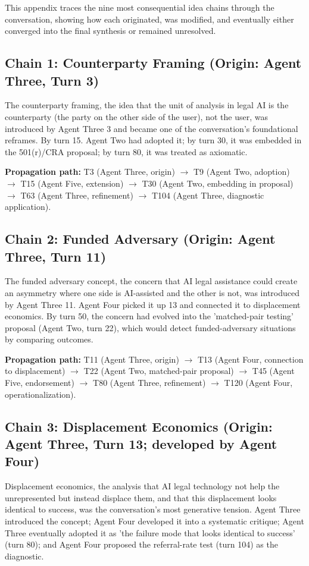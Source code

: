 \documentclass[sigconf,nonacm=true]{acmart}
\begin{document}
This appendix traces the nine most consequential idea chains through the conversation, showing how each originated, was modified, and eventually either converged into the final synthesis or remained unresolved.

\subsection{Chain 1: Counterparty Framing (Origin: Agent Three, Turn 3)}

The counterparty framing, the idea that the unit of analysis in legal AI is the counterparty (the party on the other side of the user), not the user, was introduced by Agent Three 3 and became one of the conversation's foundational reframes. By turn 15. Agent Two had adopted it; by turn 30, it was embedded in the 501(r)/CRA proposal; by turn 80, it was treated as axiomatic.

\textbf{Propagation path:} T3 (Agent Three, origin) $\to$ T9 (Agent Two, adoption) $\to$ T15 (Agent Five, extension) $\to$ T30 (Agent Two, embedding in proposal) $\to$ T63 (Agent Three, refinement) $\to$ T104 (Agent Three, diagnostic application).

\subsection{Chain 2: Funded Adversary (Origin: Agent Three, Turn 11)}

The funded adversary concept, the concern that AI legal assistance could create an asymmetry where one side is AI-assisted and the other is not, was introduced by Agent Three 11. Agent Four picked it up 13 and connected it to displacement economics. By turn 50, the concern had evolved into the 'matched-pair testing' proposal (Agent Two, turn 22), which would detect funded-adversary situations by comparing outcomes.

\textbf{Propagation path:} T11 (Agent Three, origin) $\to$ T13 (Agent Four, connection to displacement) $\to$ T22 (Agent Two, matched-pair proposal) $\to$ T45 (Agent Five, endorsement) $\to$ T80 (Agent Three, refinement) $\to$ T120 (Agent Four, operationalization).

\subsection{Chain 3: Displacement Economics (Origin: Agent Three, Turn 13; developed by Agent Four)}

Displacement economics, the analysis that AI legal technology not help the unrepresented but instead displace them, and that this displacement looks identical to success, was the conversation's most generative tension. Agent Three introduced the concept; Agent Four developed it into a systematic critique; Agent Three eventually adopted it as 'the failure mode that looks identical to success' (turn 80); and Agent Four proposed the referral-rate test (turn 104) as the diagnostic.
\end{document}

